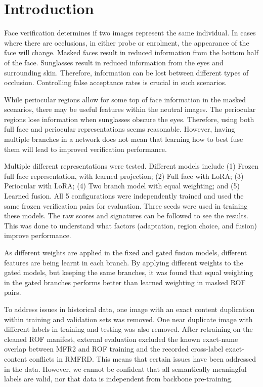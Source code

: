 \documentclass[10pt,lettersize,journal]{IEEEtran}
\begin{document}
\section{Introduction}
Face verification determines if two images represent the same individual. In cases where there are occlusions, in either probe or enrolment, the appearance of the face will change. Masked faces result in reduced information from the bottom half of the face. Sunglasses result in reduced information from the eyes and surrounding skin. Therefore, information can be lost between different types of occlusion. Controlling false acceptance rates is crucial in such scenarios.\par
While periocular regions allow for some top of face information in the masked scenarios, there may be useful features within the neutral images. The periocular regions lose information when sunglasses obscure the eyes. Therefore, using both full face and periocular representations seems reasonable. However, having multiple branches in a network does not mean that learning how to best fuse them will lead to improved verification performance.\par
Multiple different representations were tested. Different models include (1) Frozen full face representation, with learned projection; (2) Full face with LoRA; (3) Periocular with LoRA; (4) Two branch model with equal weighting; and (5) Learned fusion. All 5 configurations were independently trained and used the same frozen verification pairs for evaluation. Three seeds were used in training these models. The raw scores and signatures can be followed to see the results. This was done to understand what factors (adaptation, region choice, and fusion) improve performance.\par
As different weights are applied in the fixed and gated fusion models, different features are being learnt in each branch. By applying different weights to the gated models, but keeping the same branches, it was found that equal weighting in the gated branches performs better than learned weighting in masked ROF pairs.\par
To address issues in historical data, one image with an exact content duplication within training and validation sets was removed. One near duplicate image with different labels in training and testing was also removed. After retraining on the cleaned ROF manifest, external evaluation excluded the known exact-name overlap between MFR2 and ROF training and the recorded cross-label exact-content conflicts in RMFRD. This means that certain issues have been addressed in the data. However, we cannot be confident that all semantically meaningful labels are valid, nor that data is independent from backbone pre-training.\par
\end{document}
